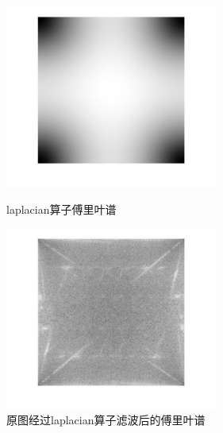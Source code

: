 \documentclass[11pt, a4paper, UTF8]{ctexart}
\begin{document}
  \begin{figure}[H]
    \centering
    \begin{minipage}[t]{0.48\textwidth}
    \centering
    \includegraphics[width=7cm]{laplacian.jpg}
    \caption{laplacian算子傅里叶谱}
    \end{minipage}
    \begin{minipage}[t]{0.48\textwidth}
    \centering
    \includegraphics[width=7cm]{laplacian_filter.jpg}
    \caption{原图经过laplacian算子滤波后的傅里叶谱}
    \end{minipage}
  \end{figure}
\end{document}
